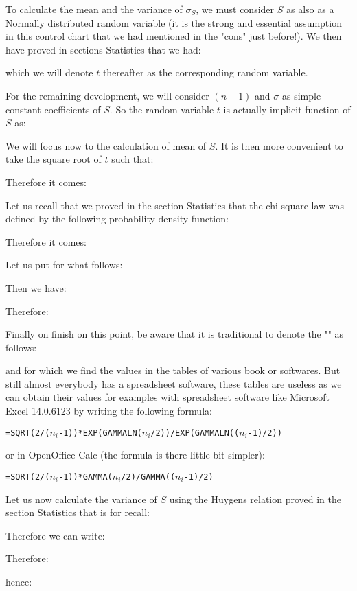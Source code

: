 	To calculate the mean and the variance of $\sigma_S$, we must consider $S$ as also as a Normally distributed random variable (it is the strong and essential assumption in this control chart that we had mentioned in the "cons" just before!). We then have proved in sections Statistics that we had:
	
	which we will denote $t$ thereafter as the corresponding random variable. 

	For the remaining development, we will consider $(n-1)$ and $\sigma$ as simple constant coefficients of $S$. So the random variable $t$ is actually implicit function of $S$ as:
	
	We will focus now to the calculation of mean of $S$. It is then more convenient to take the square root of $t$ such that:
	
	Therefore it comes:
	
	Let us recall that we proved in the section Statistics that the chi-square law was defined by the following probability density function:
	
	Therefore it comes:
	
	Let us put for what follows:
	
	Then we have:
	
	Therefore:
	
	Finally on finish on this point, be aware that it is traditional to denote the ""  as follows:
	
	and for which we find the values in the tables of various book or softwares. But still almost everybody has a spreadsheet software, these tables are useless as we can obtain their values for examples with spreadsheet software like Microsoft Excel 14.0.6123 by writing the following formula:
	\begin{center}
		\texttt{=SQRT(2/($n_i$-1))*EXP(GAMMALN($n_i$/2))/EXP(GAMMALN(($n_i$-1)/2))}
	\end{center}
	or in OpenOffice Calc (the formula is there little bit simpler):
	\begin{center}
		\texttt{=SQRT(2/($n_i$-1))*GAMMA($n_i$/2)/GAMMA(($n_i$-1)/2)}
	\end{center}
	Let us now calculate the variance of $S$ using the Huygens relation proved in the section Statistics that is for recall:
	
	Therefore we can write:
	
	
	Therefore:
	
	hence:
	

